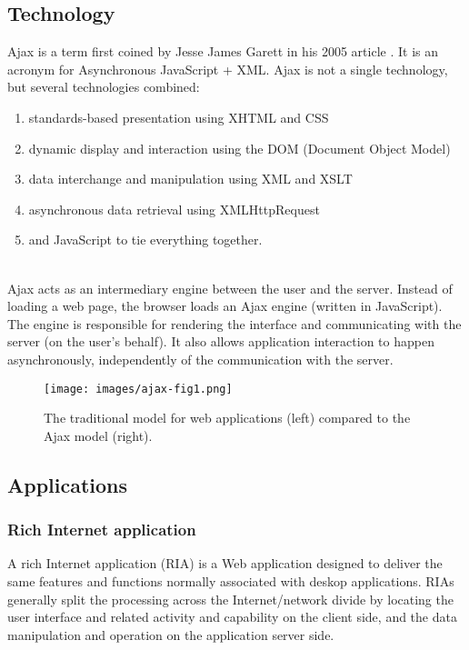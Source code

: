 \subsection{Technology}
Ajax is a term first coined by Jesse James Garett in his 2005 article \cite{garrett2005ajax}. It is an acronym for Asynchronous JavaScript + XML. Ajax is not a single technology, but several technologies combined:
\begin{enumerate}
	\item standards-based presentation using XHTML and CSS
	\item dynamic display and interaction using the DOM (Document Object Model)
	\item data interchange and manipulation using XML and XSLT
	\item asynchronous data retrieval using XMLHttpRequest
	\item and JavaScript to tie everything together.
\end{enumerate} 
~\\
Ajax acts as an intermediary engine between the user and the server. Instead of loading a web page, the browser loads an Ajax engine (written in JavaScript). The engine is responsible for rendering the interface and communicating with the server (on the user's behalf). It also allows application interaction to happen asynchronously, independently of the communication with the server.\\

\begin{figure}
	\centering
	\texttt{[image: images/ajax-fig1.png]}
	\caption{The traditional model for web applications (left) compared to the Ajax model (right).}
\end{figure}	

\subsection{Applications}

\subsubsection{Rich Internet application}
A rich Internet application (RIA) is a Web application designed to deliver the same features and functions normally associated with deskop applications. RIAs generally split the processing across the Internet/network divide by locating the user interface and related activity and capability on the client side, and the data manipulation and operation on the application server side. \\
 
